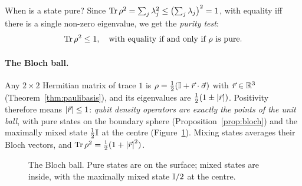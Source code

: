 When is a state pure? Since $\operatorname{Tr}\rho^2=\sum_j\lambda_j^2\le\bigl(\sum_j\lambda_j\bigr)^2=1$, with equality iff there is a single non-zero eigenvalue, we get the \emph{purity test}:
\[
  \operatorname{Tr}\rho^2\le1,\quad\text{with equality if and only if }\rho\text{ is pure.}
\]

\paragraph{The Bloch ball.}
Any $2\times2$ Hermitian matrix of trace $1$ is $\rho=\tfrac12(\mathbb{I}+\vec r\cdot\vec\sigma)$ with $\vec r\in\mathbb{R}^3$ (Theorem~\ref{thm:paulibasis}), and its eigenvalues are $\tfrac12(1\pm\left|\vec r\right|)$. Positivity therefore means $\left|\vec r\right|\le1$: \emph{qubit density operators are exactly the points of the unit ball},
with pure states on the boundary sphere (Proposition~\ref{prop:bloch}) and the maximally mixed state $\tfrac12\mathbb{I}$ at the centre (Figure~\ref{fig:blochball}). Mixing states averages their Bloch vectors, and $\operatorname{Tr}\rho^2=\tfrac12(1+\left|\vec r\right|^2)$.

\begin{figure}[htb]
  \centering
  \caption{The Bloch ball. Pure states are on the surface; mixed states are inside, with the maximally mixed state $\mathbb{I}/2$ at the centre.}
  \label{fig:blochball}
\end{figure}

